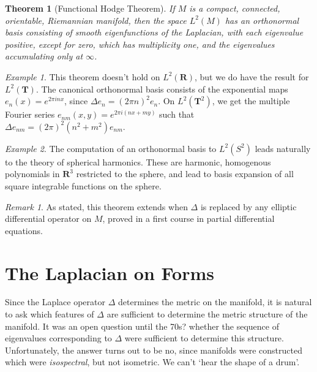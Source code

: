\documentclass{article}
\theoremstyle{plain}
\newtheorem{theorem}{Theorem}
\theoremstyle{remark}
\newtheorem*{example}{Example}
\newtheorem*{remark}{Remark}
\theoremstyle{definition}
\begin{document}
\begin{theorem}[Functional Hodge Theorem]
    If $M$ is a compact, connected, orientable, Riemannian manifold, then the space $L^2(M)$ has an orthonormal basis consisting of smooth eigenfunctions of the Laplacian, with each eigenvalue positive, except for zero, which has multiplicity one, and the eigenvalues accumulating only at $\infty$.
\end{theorem}

\begin{example}
    This theorem doesn't hold on $L^2(\mathbf{R})$, but we do have the result for $L^2(\mathbf{T})$. The canonical orthonormal basis consists of the exponential maps $e_n(x) = e^{2 \pi i n x}$, since $\Delta e_n = (2 \pi n)^2 e_n$. On $L^2(\mathbf{T}^2)$, we get the multiple Fourier series $e_{nm}(x,y) = e^{2 \pi i (n x + m y)}$ such that $\Delta e_{nm} = (2 \pi)^2 (n^2 + m^2) e_{nm}$.
\end{example}

\begin{example}
    The computation of an orthonormal basis to $L^2(S^2)$ leads naturally to the theory of spherical harmonics. These are harmonic, homogenous polynomials in $\mathbf{R}^3$ restricted to the sphere, and lead to basis expansion of all square integrable functions on the sphere.
\end{example}

\begin{remark}
    As stated, this theorem extends when $\Delta$ is replaced by any elliptic differential operator on $M$, proved in a first course in partial differential equations.
\end{remark}

\section{The Laplacian on Forms}

Since the Laplace operator $\Delta$ determines the metric on the manifold, it is natural to ask which features of $\Delta$ are sufficient to determine the metric structure of the manifold. It was an open question until the 70s? whether the sequence of eigenvalues corresponding to $\Delta$ were sufficient to determine this structure. Unfortunately, the answer turns out to be no, since manifolds were constructed which were {\it isospectral}, but not isometric. We can't `hear the shape of a drum'.
\end{document}
